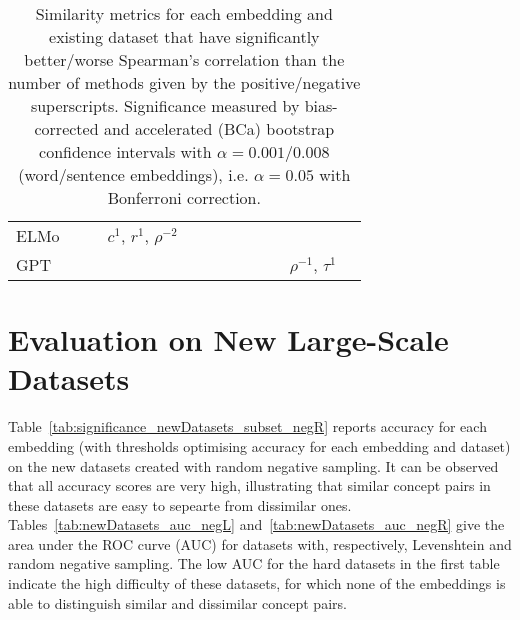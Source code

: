 \documentclass[letterpaper]{article} %
\begin{document}
\begin{sidewaystable*}
\begin{tabular}{l l l l l l l l l l l l}
\midrule
\multirow{3}{1.5cm}{ELMo} & \multirow{3}{1.5cm}{} & \multirow{3}{1.5cm}{} & \multirow{3}{1.5cm}{$c^{1}$, $r^{1}$, $\rho^{-2}$} & \multirow{3}{1.5cm}{} & \multirow{3}{1.5cm}{} & \multirow{3}{1.5cm}{} & \multirow{3}{1.5cm}{} & \multirow{3}{1.5cm}{} & \multirow{3}{1.5cm}{} & \multirow{3}{1.5cm}{} & \multirow{3}{1.5cm}{} \\ \\ \\
\midrule
\multirow{2}{1.5cm}{GPT} & \multirow{2}{1.5cm}{} & \multirow{2}{1.5cm}{} & \multirow{2}{1.5cm}{} & \multirow{2}{1.5cm}{} & \multirow{2}{1.5cm}{} & \multirow{2}{1.5cm}{} & \multirow{2}{1.5cm}{} & \multirow{2}{1.5cm}{} & \multirow{2}{1.5cm}{} & \multirow{2}{1.5cm}{$\rho^{-1}$, $\tau^{1}$} & \multirow{2}{1.5cm}{} \\ \\
\bottomrule
    \end{tabular}
    \caption{Similarity metrics for each embedding and existing dataset that have significantly better/worse Spearman's correlation than the number of methods given by the positive/negative superscripts. Significance measured by bias-corrected and accelerated (BCa)
bootstrap confidence intervals with $\alpha = 0.001$/$0.008$ (word/sentence embeddings), i.e. $\alpha = 0.05$ with Bonferroni correction.}
    \label{tab:significance_existingDatasets_methods4} 
\end{sidewaystable*}


\clearpage
\section{Evaluation on New Large-Scale Datasets}
Table~\ref{tab:significance_newDatasets_subset_negR} reports accuracy for each embedding (with thresholds optimising accuracy for each embedding and dataset) on the new datasets created with random negative sampling. It can be observed that all accuracy scores are very high, illustrating that similar concept pairs in these datasets are easy to sepearte from dissimilar ones.
Tables~\ref{tab:newDatasets_auc_negL} and~\ref{tab:newDatasets_auc_negR} give the area under the ROC curve (AUC) for datasets with, respectively, Levenshtein and random negative sampling. The low AUC for the hard datasets in the first table indicate the high difficulty of these datasets, for which none of the embeddings is able to distinguish similar and dissimilar concept pairs.
\end{document}
